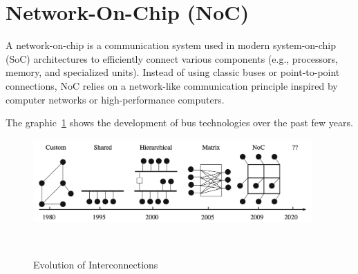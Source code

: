 \section{Network-On-Chip (NoC)}

A network-on-chip is a communication system used in modern system-on-chip (SoC) architectures to efficiently connect various components (e.g., processors, memory, and specialized units). Instead of using classic buses or point-to-point connections, NoC relies on a network-like communication principle inspired by computer networks or high-performance computers. 

The graphic~\ref{fig:Evolution_of_Interconnection} shows the development of bus technologies over the past few years.
\begin{figure}[htbp]
    \centering
    \includegraphics[width=0.95\textwidth]{img/Evolution of On-Chip communication interconnect.png}
    \caption{Evolution of Interconnections}~\cite{abderazek_multicore_2013}\label{fig:Evolution_of_Interconnection}
\end{figure}

